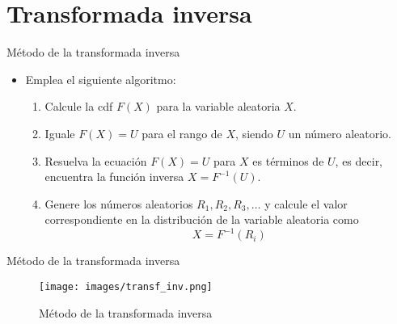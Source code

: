 \section{Transformada inversa}


\begin{frame}{Método de la transformada inversa}
    \begin{itemize}
        \item Emplea el siguiente algoritmo:
    \begin{enumerate}
        \item Calcule la cdf $F(X)$ para la variable aleatoria $X$.
        \item Iguale $F(X)=U$ para el rango de $X$, siendo $U$ un número aleatorio.
        \item Resuelva la ecuación $F(X)=U$ para $X$ es términos de $U$, es decir, encuentra la función inversa $X=F^{-1} \left(U\right)$.
        \item Genere los números aleatorios $R_1, R_2, R_3, \dots$ y calcule el valor correspondiente en la distribución de la variable aleatoria como \begin{equation*}
            X=F^{-1} \left(R_i\right)
        \end{equation*}
    \end{enumerate}
    \end{itemize}
\end{frame}

\begin{frame}{Método de la transformada inversa}
    \begin{figure}
        \centering
        \texttt{[image: images/transf\_inv.png]}
        \caption{Método de la transformada inversa}
        \label{fig:my_label}
    \end{figure}    
\end{frame}

